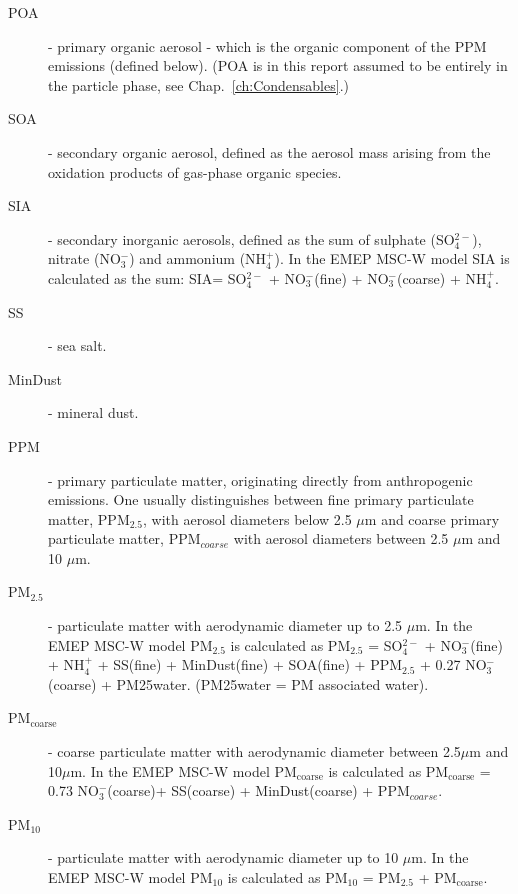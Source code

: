 \begin{description}

\item[POA] - primary organic aerosol - which is the organic component of
the PPM emissions (defined below). (POA is in this report assumed to
be entirely in the particle phase, see Chap.~\ref{ch:Condensables}.)
  
\item[SOA] - secondary organic aerosol, defined as the aerosol mass
  arising from the oxidation products of gas-phase organic species.

\item[SIA]- secondary inorganic aerosols, defined as the sum of
  sulphate (SO$^{2-}_4$), nitrate (NO$^-_3$) and ammonium (NH$^+_4$).
  In the EMEP MSC-W model SIA is calculated as the sum: SIA= SO$^{2-}_4$
  + NO$^-_3$(fine) + NO$^-_3$(coarse) + NH$^+_4$.

\item[SS] - sea salt.

\item[MinDust] - mineral dust.

\item[PPM] - primary particulate matter, originating directly from
  anthropogenic emissions. One usually distinguishes between fine
  primary particulate matter, PPM$_{2.5}$, with aerosol diameters
  below 2.5 $\mu$m and coarse primary particulate matter, PPM$_{coarse}$
  with aerosol diameters between 2.5 $\mu$m and 10 $\mu$m.

\item[PM$_{2.5}$] - particulate matter with aerodynamic diameter
  up to 2.5 $\mu$m. In the EMEP
  MSC-W model PM$_{2.5}$ is calculated as PM$_{2.5}$ = SO$^{2-}_4$
  + NO$^-_3$(fine) + NH$^+_4$ + SS(fine) + MinDust(fine)
  + SOA(fine) + PPM$_{2.5}$ + 0.27 NO$^-_3$(coarse) + PM25water.
  (PM25water = PM associated water).

\item[PM$_{\text{coarse}}$] - coarse particulate matter with aerodynamic
  diameter between 2.5$\mu$m 
  and 10$\mu$m. In the EMEP MSC-W model PM$_{\text{coarse}}$ is calculated
  as PM$_{\text{coarse}}$ = 0.73 NO$^-_3$(coarse)+ SS(coarse)
  + MinDust(coarse) + PPM$_{coarse}$.

\item[PM$_{10}$] - particulate matter with aerodynamic diameter
  up to 10 $\mu$m. In the EMEP
   MSC-W model PM$_{10}$ is calculated as PM$_{10}$ = PM$_{2.5}$
  + PM$_{\text{coarse}}$.

\end{description}

